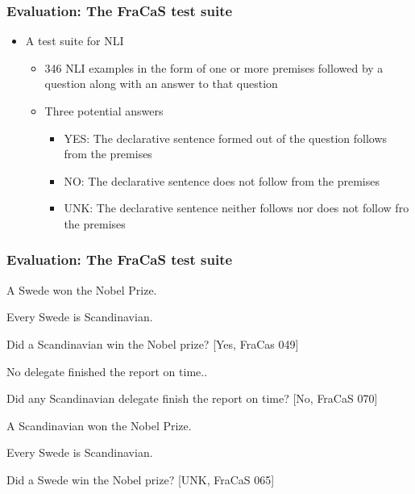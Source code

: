 \documentclass[11pt]{beamer}
\newcommand{\ex}{\item}
\newenvironment{exe}{\begin{lingex}}{\end{lingex}}
\begin{document}
\begin{frame}
  \frametitle{Evaluation: The FraCaS test suite}
  \begin{itemize}
  \item A test suite for NLI
    \begin{itemize}
    \item 346 NLI examples in the form of one or more premises
      followed by a question along with an answer to that question
    \item Three potential answers
      \begin{itemize}
      \item YES: The declarative sentence formed out of the question follows from the premises
      \item NO: The declarative sentence does not follow from the premises
      \item UNK: The declarative sentence neither follows nor does not follow fro the premises
      \end{itemize}\end{itemize}\end{itemize}
\end{frame}


\begin{frame}
  \frametitle{Evaluation: The FraCaS test suite}
  
  \begin{exe}
    \ex
    A Swede won the Nobel Prize.
    
    Every Swede is  Scandinavian.
    
    Did a Scandinavian win the Nobel prize? [Yes, FraCas 049]
  \end{exe}
  
  
  
  \begin{exe}
    \ex
    No delegate finished the report on time..
    
    Did any Scandinavian delegate finish the report on time? [No, FraCaS 070]
  \end{exe}
  
  
  \begin{exe}
    \ex
    A Scandinavian won the Nobel Prize.
    
    Every Swede is  Scandinavian.
    
    Did a Swede win the Nobel prize? [UNK, FraCaS 065]\end{exe}



\end{frame}
\end{document}
